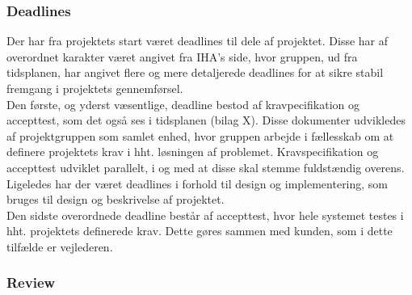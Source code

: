 \subsubsection{Deadlines}
Der har fra projektets start været deadlines til dele af projektet. Disse har af overordnet karakter været angivet fra IHA's side, hvor gruppen, ud fra tidsplanen, har angivet flere og mere detaljerede deadlines for at sikre stabil fremgang i projektets gennemførsel. \\
Den første, og yderst væsentlige, deadline bestod af kravpecifikation og accepttest, som det også ses i tidsplanen (bilag X). Disse dokumenter udvikledes af projektgruppen som samlet enhed, hvor gruppen arbejde i fællesskab om at definere projektets krav i hht. løsningen af problemet. Kravspecifikation og accepttest udviklet parallelt, i og med at disse skal stemme fuldstændig overens. \\
\newline
Ligeledes har der været deadlines i forhold til design og implementering, som bruges til design og beskrivelse af projektet.\\
\newline
Den sidste overordnede deadline består af accepttest, hvor hele systemet testes i hht. projektets definerede krav. Dette gøres sammen med kunden, som i dette tilfælde er vejlederen. 


\subsubsection{Review}


